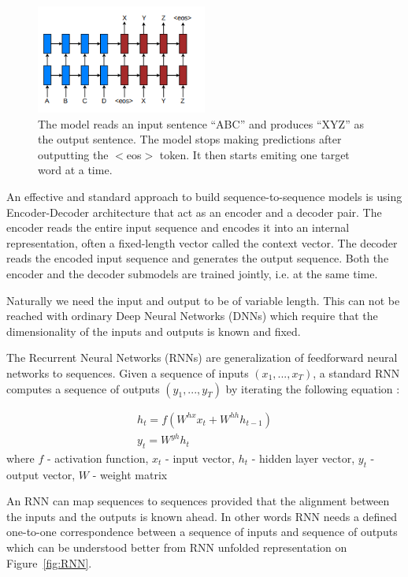 \begin{figure}[h]
	\centering
	\includegraphics[width=0.5\textwidth]{img/seq-to-seq.png}
	\caption{\label{fig:seq-to-seq}The model reads an input sentence “ABC” and produces “XYZ” as the output 	sentence. The model stops making predictions after outputting the $<$eos$>$ token. It then starts 	emiting one target word at a time. }
\end{figure}


An effective and standard approach to build sequence-to-sequence models is using Encoder-Decoder architecture that act as an encoder and a decoder pair. The encoder reads the entire input sequence and encodes it into an internal representation, often a fixed-length vector called the context vector. The decoder reads the encoded input sequence and generates the output sequence. Both the encoder and the decoder submodels are trained jointly, i.e. at the same time.

Naturally we need the input and output to be of variable length. This can not be reached with ordinary Deep Neural Networks (DNNs) which require that the dimensionality of the inputs and outputs is known and fixed. 

The Recurrent Neural Networks (RNNs) are generalization of feedforward neural networks to sequences. Given a sequence of inputs $(x_1, ..., x_T)$, a standard RNN computes a
sequence of outputs $(y_1, ..., y_T)$ by iterating the following equation \cite{seq2seq_with_NN} :

\begin{equation}
\begin{array}{l}
	h_t = f(W^{hx}x_t + W^{hh}h_{t-1}) \\
	y_t = W^{yh}h_t
\end{array}
\end{equation}
where 
$f$ - activation function,
$x_{t}$ - input vector, 
$h_{t}$ - hidden layer vector,
$y_{t}$ - output vector,
$W$ - weight matrix
 
 
An RNN can map sequences to sequences provided that the alignment between the inputs and the outputs is known ahead. In other words RNN needs a defined one-to-one correspondence between a sequence of inputs and sequence of outputs which can be understood better from RNN unfolded representation on Figure~\ref{fig:RNN}.

